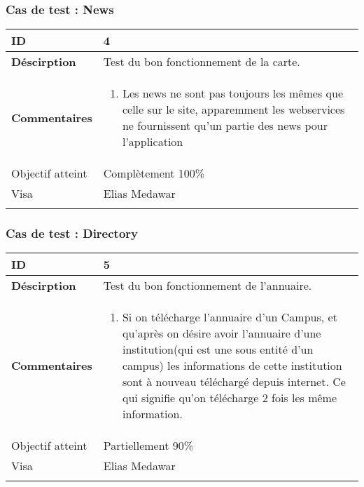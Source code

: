 		 		 \subsubsection*{Cas de test : News}
		 		 		 		 		 \begin{longtable}{m{4cm}|p{10cm}|}
		 		 		 		 		 \textbf{ ID} & 4 \\
		 		 		 		 		 \hline \textbf{Déscirption} &  Test du bon fonctionnement de la carte.\\
		 		 		 		 		 \hline \textbf{Commentaires} &  
		 		 		 		 		 	 	 \begin{enumerate}
		 		 	 		 		 		 	 		\item Les news ne sont pas toujours les mêmes que celle sur le site, apparemment les webservices ne fournissent qu'un partie des news pour l'application
		 		 	 		 					 	\end{enumerate} \\
		 		 	 		 		 		 \hline Objectif atteint & {\color{green} Complètement 100\% \CheckedBox } \\
		 		 	 		 		 		\hline Visa & Elias Medawar 	\\
		 		 		 		 		\\
		 		 		 		 \end{longtable} 
		 		 		 		 
		 		 \subsubsection*{Cas de test : Directory}
		 		 		 		 		 \begin{longtable}{m{4cm}|p{10cm}|}
		 		 		 		 		 \textbf{ ID} & 5 \\
		 		 		 		 		 \hline \textbf{Déscirption} &  Test du bon fonctionnement de l'annuaire.\\
		 		 		 		 		 \hline \textbf{Commentaires} &  
		 		 		 		 		 	 	 \begin{enumerate}
					 		 	 		 		 		 	 		\item Si on télécharge l'annuaire d'un Campus, et qu'après on désire avoir l'annuaire d'une institution(qui est une sous entité d'un campus) les informations de cette institution sont à nouveau téléchargé depuis internet. Ce qui signifie qu'on télécharge 2 fois les même information.
					 		 	 		 					 	\end{enumerate} \\
		 		 	 		 		 		 \hline Objectif atteint & {\color{orange} Partiellement 90\% \XBox } \\
					 		 	 		 		 		\hline Visa & Elias Medawar 	\\
					 		 		 		 		\\
		 		 		 		 \end{longtable}

